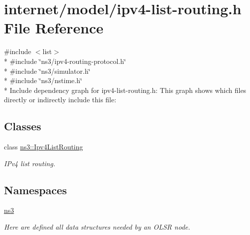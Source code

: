 \hypertarget{ipv4-list-routing_8h}{}\section{internet/model/ipv4-\/list-\/routing.h File Reference}
\label{ipv4-list-routing_8h}
{\ttfamily \#include $<$list$>$}\\*
{\ttfamily \#include \char`\"{}ns3/ipv4-\/routing-\/protocol.\+h\char`\"{}}\\*
{\ttfamily \#include \char`\"{}ns3/simulator.\+h\char`\"{}}\\*
{\ttfamily \#include \char`\"{}ns3/nstime.\+h\char`\"{}}\\*
Include dependency graph for ipv4-\/list-\/routing.h\+:
This graph shows which files directly or indirectly include this file\+:
\subsection*{Classes}
\begin{DoxyCompactItemize}
\item 
class \hyperlink{classns3_1_1Ipv4ListRouting}{ns3\+::\+Ipv4\+List\+Routing}
\begin{DoxyCompactList}\small\item\em I\+Pv4 list routing. \end{DoxyCompactList}\end{DoxyCompactItemize}
\subsection*{Namespaces}
\begin{DoxyCompactItemize}
\item 
 \hyperlink{namespacens3}{ns3}
\begin{DoxyCompactList}\small\item\em Here are defined all data structures needed by an O\+L\+SR node. \end{DoxyCompactList}\end{DoxyCompactItemize}
